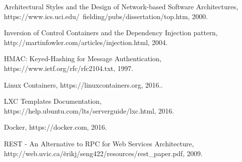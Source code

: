 \documentclass[conference, spanish]{IEEEtran}
\begin{document}
\begin{thebibliography}{1}
 Architectural Styles and
the Design of Network-based Software Architectures, https://www.ics.uci.edu/~fielding/pubs/dissertation/top.htm, 2000.

 Inversion of Control Containers and the Dependency Injection pattern, http://martinfowler.com/articles/injection.html, 2004.

HMAC: Keyed-Hashing for Message Authentication, https://www.ietf.org/rfc/rfc2104.txt, 1997.

Linux Containers, https://linuxcontainers.org, 2016..

LXC Templates Documentation, https://help.ubuntu.com/lts/serverguide/lxc.html, 2016.

Docker, https://docker.com, 2016.

 REST - An Alternative to RPC for Web Services Architecture, http://web.uvic.ca/\~erikj/seng422/resources/rest\_paper.pdf, 2009.



\end{thebibliography}




\end{document}
